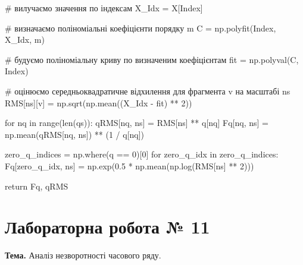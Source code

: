 \documentclass[
  letterpaper,
]{report}
\newenvironment{Shaded}{\begin{snugshade}}{\end{snugshade}}
\newcommand{\BuiltInTok}[1]{\textcolor[rgb]{0.00,0.23,0.31}{#1}}
\newcommand{\CommentTok}[1]{\textcolor[rgb]{0.37,0.37,0.37}{#1}}
\newcommand{\ControlFlowTok}[1]{\textcolor[rgb]{0.00,0.23,0.31}{#1}}
\newcommand{\DecValTok}[1]{\textcolor[rgb]{0.68,0.00,0.00}{#1}}
\newcommand{\FloatTok}[1]{\textcolor[rgb]{0.68,0.00,0.00}{#1}}
\newcommand{\KeywordTok}[1]{\textcolor[rgb]{0.00,0.23,0.31}{#1}}
\newcommand{\NormalTok}[1]{\textcolor[rgb]{0.00,0.23,0.31}{#1}}
\newcommand{\OperatorTok}[1]{\textcolor[rgb]{0.37,0.37,0.37}{#1}}
\begin{document}
\begin{Shaded}
\begin{Highlighting}[]
            \CommentTok{\# вилучаємо значення по індексам}
\NormalTok{            X\_Idx }\OperatorTok{=}\NormalTok{ X[Index]                       }

            \CommentTok{\# визначаємо поліноміальні коефіцієнти порядку m}
\NormalTok{            C }\OperatorTok{=}\NormalTok{ np.polyfit(Index, X\_Idx, m) }
            
            \CommentTok{\# будуємо поліноміальну криву по визначеним коефіцієнтам}
\NormalTok{            fit }\OperatorTok{=}\NormalTok{ np.polyval(C, Index)  }

            \CommentTok{\# оцінюємо середньоквадратичне відхилення для фрагмента v на масштабі ns }
\NormalTok{            RMS[ns][v] }\OperatorTok{=}\NormalTok{ np.sqrt(np.mean((X\_Idx }\OperatorTok{{-}}\NormalTok{ fit) }\OperatorTok{**} \DecValTok{2}\NormalTok{)) }

        \ControlFlowTok{for}\NormalTok{ nq }\KeywordTok{in} \BuiltInTok{range}\NormalTok{(}\BuiltInTok{len}\NormalTok{(qs)):}
\NormalTok{            qRMS[nq, ns] }\OperatorTok{=}\NormalTok{ RMS[ns] }\OperatorTok{**}\NormalTok{ q[nq]}
\NormalTok{            Fq[nq, ns] }\OperatorTok{=}\NormalTok{ np.mean(qRMS[nq, ns]) }\OperatorTok{**}\NormalTok{ (}\DecValTok{1} \OperatorTok{/}\NormalTok{ q[nq])}

\NormalTok{        zero\_q\_indices }\OperatorTok{=}\NormalTok{ np.where(q }\OperatorTok{==} \DecValTok{0}\NormalTok{)[}\DecValTok{0}\NormalTok{]}
        \ControlFlowTok{for}\NormalTok{ zero\_q\_idx }\KeywordTok{in}\NormalTok{ zero\_q\_indices:}
\NormalTok{            Fq[zero\_q\_idx, ns] }\OperatorTok{=}\NormalTok{ np.exp(}\FloatTok{0.5} \OperatorTok{*}\NormalTok{ np.mean(np.log(RMS[ns] }\OperatorTok{**} \DecValTok{2}\NormalTok{)))}

    \ControlFlowTok{return}\NormalTok{ Fq, qRMS }
\end{Highlighting}
\end{Shaded}


\hypertarget{ux43bux430ux431ux43eux440ux430ux442ux43eux440ux43dux430-ux440ux43eux431ux43eux442ux430-11}{%
\chapter{Лабораторна робота №
11}\label{ux43bux430ux431ux43eux440ux430ux442ux43eux440ux43dux430-ux440ux43eux431ux43eux442ux430-11}}

\textbf{Тема.} Аналіз незворотності часового ряду.
\end{document}
